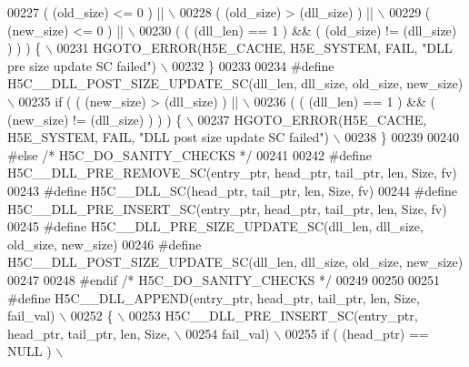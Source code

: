 \begin{DoxyCode}
00227 \textcolor{preprocessor}{     ( (old\_size) <= 0 ) ||                                                   \(\backslash\)}
00228 \textcolor{preprocessor}{     ( (old\_size) > (dll\_size) ) ||                                           \(\backslash\)}
00229 \textcolor{preprocessor}{     ( (new\_size) <= 0 ) ||                                                   \(\backslash\)}
00230 \textcolor{preprocessor}{     ( ( (dll\_len) == 1 ) && ( (old\_size) != (dll\_size) ) ) ) \{               \(\backslash\)}
00231 \textcolor{preprocessor}{    HGOTO\_ERROR(H5E\_CACHE, H5E\_SYSTEM, FAIL, "DLL pre size update SC failed") \(\backslash\)}
00232 \textcolor{preprocessor}{\}}
00233 
00234 \textcolor{preprocessor}{#define H5C\_\_DLL\_POST\_SIZE\_UPDATE\_SC(dll\_len, dll\_size, old\_size, new\_size)    \(\backslash\)}
00235 \textcolor{preprocessor}{if ( ( (new\_size) > (dll\_size) ) ||                                            \(\backslash\)}
00236 \textcolor{preprocessor}{     ( ( (dll\_len) == 1 ) && ( (new\_size) != (dll\_size) ) ) ) \{                \(\backslash\)}
00237 \textcolor{preprocessor}{    HGOTO\_ERROR(H5E\_CACHE, H5E\_SYSTEM, FAIL, "DLL post size update SC failed") \(\backslash\)}
00238 \textcolor{preprocessor}{\}}
00239 
00240 \textcolor{preprocessor}{#else }\textcolor{comment}{/* H5C\_DO\_SANITY\_CHECKS */}\textcolor{preprocessor}{}
00241 
00242 \textcolor{preprocessor}{#define H5C\_\_DLL\_PRE\_REMOVE\_SC(entry\_ptr, head\_ptr, tail\_ptr, len, Size, fv)}
00243 \textcolor{preprocessor}{#define H5C\_\_DLL\_SC(head\_ptr, tail\_ptr, len, Size, fv)}
00244 \textcolor{preprocessor}{#define H5C\_\_DLL\_PRE\_INSERT\_SC(entry\_ptr, head\_ptr, tail\_ptr, len, Size, fv)}
00245 \textcolor{preprocessor}{#define H5C\_\_DLL\_PRE\_SIZE\_UPDATE\_SC(dll\_len, dll\_size, old\_size, new\_size)}
00246 \textcolor{preprocessor}{#define H5C\_\_DLL\_POST\_SIZE\_UPDATE\_SC(dll\_len, dll\_size, old\_size, new\_size)}
00247 
00248 \textcolor{preprocessor}{#endif }\textcolor{comment}{/* H5C\_DO\_SANITY\_CHECKS */}\textcolor{preprocessor}{}
00249 
00250 
00251 \textcolor{preprocessor}{#define H5C\_\_DLL\_APPEND(entry\_ptr, head\_ptr, tail\_ptr, len, Size, fail\_val) \(\backslash\)}
00252 \textcolor{preprocessor}{\{                                                                           \(\backslash\)}
00253 \textcolor{preprocessor}{    H5C\_\_DLL\_PRE\_INSERT\_SC(entry\_ptr, head\_ptr, tail\_ptr, len, Size,        \(\backslash\)}
00254 \textcolor{preprocessor}{                           fail\_val)                                        \(\backslash\)}
00255 \textcolor{preprocessor}{    if ( (head\_ptr) == NULL )                                               \(\backslash\)}

\end{DoxyCode}
